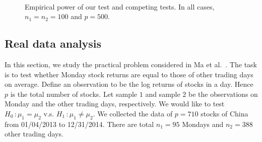 \documentclass[times,sort&compress,3p]{elsarticle}
\theoremstyle{plain}
\theoremstyle{definition}
\theoremstyle{remark}
\begin{document}
\begin{figure}
    \\
    \caption{Empirical power of our test and competing tests. In all cases, $n_1=n_2=100$ and $p=500$.}\label{fig:Power2}
\end{figure}




\subsection{Real data analysis}
In this section, we study the practical problem considered in Ma {\rm et al.}~\cite{Ma2015A}.
The task is to test whether Monday stock returns are equal to those of other trading days on average.
Define an observation to be the log returns of stocks in a day.
Hence $p$ is the total number of stocks.
Let sample $1$ and sample $2$ be the observations on Monday and the other trading days, respectively.
We would like to test $H_0\, :\mu_1=\mu_2$ v.s. $H_1\,:\mu_1\neq \mu_2$.
We collected the data of $p=710$
 stocks of China
from 01/04/2013 to 12/31/2014. There are total $n_1=95$ Mondays and $n_2=388$ other trading days. 
\end{document}
